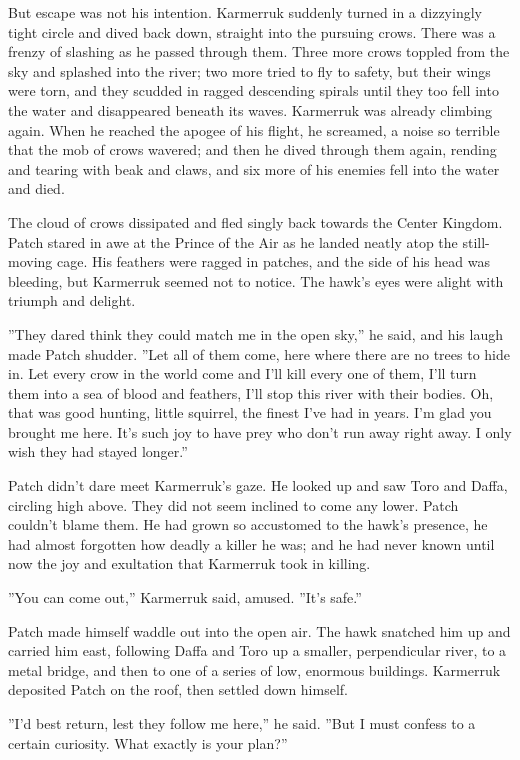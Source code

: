\documentclass[12pt]{book}
\begin{document}
But escape was not his intention. Karmerruk suddenly turned in a dizzyingly tight circle and dived back down, straight into the pursuing crows. There was a frenzy of slashing as he passed through them. Three more crows toppled from the sky and splashed into the river; two more tried to fly to safety, but their wings were torn, and they scudded in ragged descending spirals until they too fell into the water and disappeared beneath its waves. Karmerruk was already climbing again. When he reached the apogee of his flight, he screamed, a noise so terrible that the mob of crows wavered; and then he dived through them again, rending and tearing with beak and claws, and six more of his enemies fell into the water and died. 

The cloud of crows dissipated and fled singly back towards the Center Kingdom. Patch stared in awe at the Prince of the Air as he landed neatly atop the still-moving cage. His feathers were ragged in patches, and the side of his head was bleeding, but Karmerruk seemed not to notice. The hawk's eyes were alight with triumph and delight.

''They dared think they could match me in the open sky,'' he said, and his laugh made Patch shudder. ''Let all of them come, here where there are no trees to hide in. Let every crow in the world come and I'll kill every one of them, I'll turn them into a sea of blood and feathers, I'll stop this river with their bodies. Oh, that was good hunting, little squirrel, the finest I've had in years. I'm glad you brought me here. It's such joy to have prey who don't run away right away. I only wish they had stayed longer.''

Patch didn't dare meet Karmerruk's gaze. He looked up and saw Toro and Daffa, circling high above. They did not seem inclined to come any lower. Patch couldn't blame them. He had grown so accustomed to the hawk's presence, he had almost forgotten how deadly a killer he was; and he had never known until now the joy and exultation that Karmerruk took in killing.

''You can come out,'' Karmerruk said, amused. ''It's safe.''

Patch made himself waddle out into the open air. The hawk snatched him up and carried him east, following Daffa and Toro up a smaller, perpendicular river, to a metal bridge, and then to one of a series of low, enormous buildings. Karmerruk deposited Patch on the roof, then settled down himself.

''I'd best return, lest they follow me here,'' he said. ''But I must confess to a certain curiosity. What exactly is your plan?''
\end{document}
